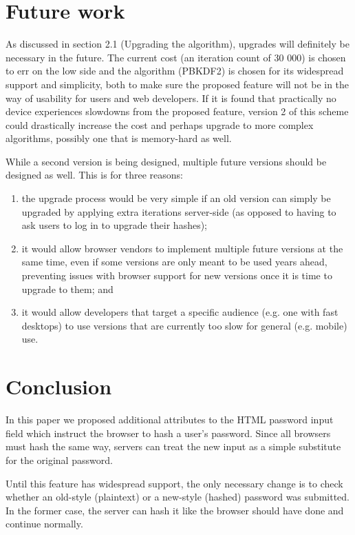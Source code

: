 \documentclass{paper}
\begin{document}
\section{Future work}

As discussed in section 2.1 (Upgrading the algorithm), upgrades will definitely be necessary
in the future. The current cost (an iteration count of 30 000) is chosen to err on the low
side and the algorithm (PBKDF2) is chosen for its widespread support and simplicity, both to
make sure the proposed feature will not be in the way of usability for users and web
developers. If it is found that practically no device experiences slowdowns from the proposed
feature, version 2 of this scheme could drastically increase the cost and perhaps upgrade to
more complex algorithms, possibly one that is memory-hard as well.

While a second version is being designed, multiple future versions should be designed as
well. This is for three reasons:

\begin{enumerate}
\item the upgrade process would be very simple if an old version can simply be upgraded by
applying extra iterations server-side (as opposed to having to ask users to log in to upgrade
their hashes);
\item it would allow browser vendors to implement multiple future versions at the same time,
even if some versions are only meant to be used years ahead, preventing issues with browser
support for new versions once it is time to upgrade to them; and
\item it would allow developers that target a specific audience (e.g. one with fast desktops)
to use versions that are currently too slow for general (e.g. mobile) use.
\end{enumerate}

\section*{Conclusion}

In this paper we proposed additional attributes to the HTML password input field which
instruct the browser to hash a user's password. Since all browsers must hash the same way,
servers can treat the new input as a simple substitute for the original password.

Until this feature has widespread support, the only necessary change is to check whether an
old-style (plaintext) or a new-style (hashed) password was submitted. In the former case, the
server can hash it like the browser should have done and continue normally.
\end{document}
